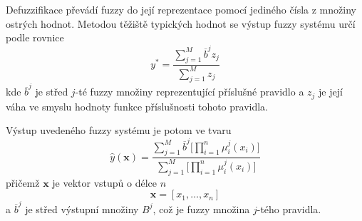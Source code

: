 Defuzzifikace převádí fuzzy do její reprezentace pomocí jediného čísla z množiny ostrých hodnot. Metodou těžiště typických hodnot se výstup fuzzy systému určí podle rovnice
\begin{equation}
    y^*=\frac{\sum_{j=1}^M\overline{b}^j z_j}{\sum_{j=1}^M z_j}
\end{equation}
kde $\overline{b}^j$ je střed $j$-té fuzzy množiny reprezentující příslušné pravidlo a $z_j$ je její váha ve smyslu hodnoty funkce příslušnosti tohoto pravidla.
\par
Výstup uvedeného fuzzy systému je potom ve tvaru
\begin{equation}
    \hat{y}(\textbf{x})=\frac{\sum_{j=1}^M \overline{b}^j\big[\prod_{i=1}^n\mu_i^j(x_i)\big]}{\sum_{j=1}^M\big[\prod_{i=1}^n\mu_i^j(x_i)\big]}
\end{equation}
přičemž $\textbf{x}$ je vektor vstupů o délce $n$
\begin{equation}
    \textbf{x}=[x_1,\dots,x_n]
\end{equation}
a $\overline{b}^j$ je střed výstupní množiny $B^j$, což je fuzzy množina  $j$-tého pravidla. 

